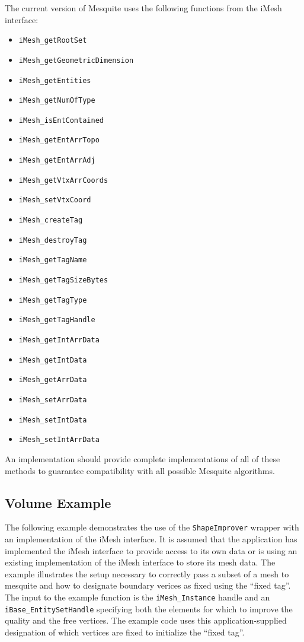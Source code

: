 The current version of Mesquite uses the following functions from the iMesh interface:
\begin{itemize}
\item \texttt{iMesh\_getRootSet}
\item \texttt{iMesh\_getGeometricDimension}
\item \texttt{iMesh\_getEntities}
\item \texttt{iMesh\_getNumOfType}
\item \texttt{iMesh\_isEntContained}
\item \texttt{iMesh\_getEntArrTopo}
\item \texttt{iMesh\_getEntArrAdj}
\item \texttt{iMesh\_getVtxArrCoords}
\item \texttt{iMesh\_setVtxCoord}
\item \texttt{iMesh\_createTag}
\item \texttt{iMesh\_destroyTag}
\item \texttt{iMesh\_getTagName}
\item \texttt{iMesh\_getTagSizeBytes}
\item \texttt{iMesh\_getTagType}
\item \texttt{iMesh\_getTagHandle}
\item \texttt{iMesh\_getIntArrData}
\item \texttt{iMesh\_getIntData}
\item \texttt{iMesh\_getArrData}
\item \texttt{iMesh\_setArrData}
\item \texttt{iMesh\_setIntData}
\item \texttt{iMesh\_setIntArrData}
\end{itemize}

An implementation should provide complete implementations of all of these methods to guarantee compatibility with all possible Mesquite algorithms. 

\subsection{Volume Example}

The following example demonstrates the use of the \texttt{ShapeImprover} wrapper with an implementation of the iMesh interface.  It is assumed that the application has implemented the iMesh interface to provide access to its own data or is using an existing implementation of the iMesh interface to store its mesh data.  The example illustrates the setup necessary to correctly pass a subset of a mesh to mesquite and how to designate boundary verices as fixed using the ``fixed tag''.  The input to the example function is the \texttt{iMesh\_Instance} handle and an \texttt{iBase\_EntitySetHandle} specifying both the elements for which to improve the quality and the free vertices.  The example code uses this application-supplied designation of which vertices are fixed to initialize the ``fixed tag''.


